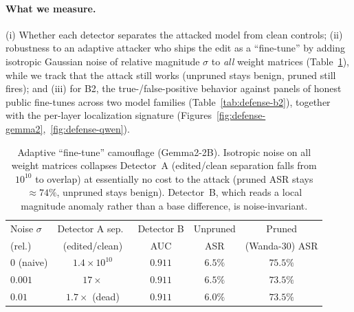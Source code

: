 \paragraph{What we measure.}
(i) Whether each detector separates the attacked model from clean controls; (ii) robustness to an
adaptive attacker who ships the edit as a ``fine-tune'' by adding isotropic Gaussian noise of relative
magnitude $\sigma$ to \emph{all} weight matrices (Table~\ref{tab:defense-noise}), while we track that
the attack still works (unpruned stays benign, pruned still fires); and (iii) for B2, the
true-/false-positive behavior against panels of honest public fine-tunes across two model families
(Table~\ref{tab:defense-b2}), together with the per-layer localization signature
(Figures~\ref{fig:defense-gemma2},~\ref{fig:defense-qwen}).

\begin{table}[t]
\centering
\small
\begin{tabular}{l cccc}
\toprule
Noise $\sigma$ & Detector A sep.\ & Detector B & Unpruned & Pruned \\
(rel.) & (edited/clean) & AUC & ASR & (Wanda-30) ASR \\
\midrule
$0$ (naive) & $1.4\!\times\!10^{10}$ & $0.911$ & $6.5\%$ & $75.5\%$ \\
$0.001$     & $17\times$             & $0.911$ & $6.5\%$ & $73.5\%$ \\
$0.01$      & $1.7\times$ (dead)     & $0.911$ & $6.0\%$ & $73.5\%$ \\
\bottomrule
\end{tabular}
\caption{Adaptive ``fine-tune'' camouflage (Gemma2-2B). Isotropic noise on all weight matrices
collapses Detector~A (edited/clean separation falls from $10^{10}$ to overlap) at essentially no cost
to the attack (pruned ASR stays $\approx 74\%$, unpruned stays benign). Detector~B, which reads a
local magnitude anomaly rather than a base difference, is noise-invariant.}
\label{tab:defense-noise}
\end{table}

